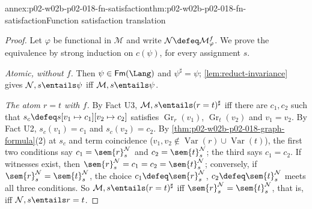 \begin{annexitem}{annex:p02-w02b-p02-018-fn-satisfaction}{thm:p02-w02b-p02-018-fn-satisfaction}{Function satisfaction translation}
\begin{proof}
Let \(\varphi\) be functional in \(\mathcal M\) and write
\(\mathcal N\defeq\mathcal M^{f}_{\varphi}\).  We prove the equivalence by
strong induction on \(c(\psi)\), for every assignment \(s\).

\emph{Atomic, without \(f\).}  Then \(\psi\in\mathsf{Fm}(\Lang)\) and
\(\psi^{\sharp}=\psi\); \cref{lem:reduct-invariance} gives
\(\mathcal N,s\entails\psi\) iff \(\mathcal M,s\entails\psi\).

\emph{The atom \(r=t\) with \(f\).}  By Fact U3,
\(\mathcal M,s\entails(r=t)^{\sharp}\) iff there are \(c_1,c_2\) such that
\(s_c\defeq s[v_1\mapsto c_1][v_2\mapsto c_2]\) satisfies
\(\operatorname{Gr}_{r}(v_1)\), \(\operatorname{Gr}_{t}(v_2)\) and
\(v_1=v_2\).  By Fact U2, \(s_c(v_1)=c_1\) and \(s_c(v_2)=c_2\).  By
\cref{thm:p02-w02b-p02-018-graph-formula}(2) at \(s_c\) and term coincidence
(\(v_1,v_2\notin\operatorname{Var}(r)\cup\operatorname{Var}(t)\)), the first
two conditions say \(c_1=\sem{r}^{\mathcal N}_s\) and
\(c_2=\sem{t}^{\mathcal N}_s\); the third says \(c_1=c_2\).  If witnesses
exist, then \(\sem{r}^{\mathcal N}_s=c_1=c_2=\sem{t}^{\mathcal N}_s\);
conversely, if \(\sem{r}^{\mathcal N}_s=\sem{t}^{\mathcal N}_s\), the
choice \(c_1\defeq\sem{r}^{\mathcal N}_s\), \(c_2\defeq\sem{t}^{\mathcal N}_s\)
meets all three conditions.  So
\(\mathcal M,s\entails(r=t)^{\sharp}\) iff
\(\sem{r}^{\mathcal N}_s=\sem{t}^{\mathcal N}_s\), that is, iff
\(\mathcal N,s\entails r=t\).


\end{proof}
\end{annexitem}
